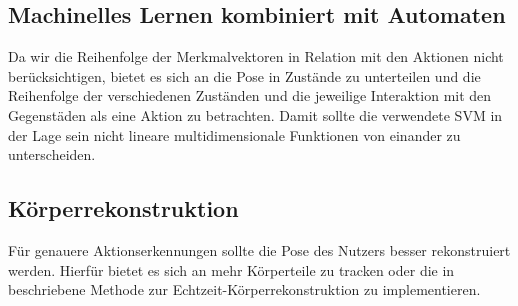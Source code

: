 \subsection{Machinelles Lernen kombiniert mit Automaten}
Da wir die Reihenfolge der Merkmalvektoren in Relation mit den Aktionen nicht berücksichtigen, bietet es sich an die Pose in Zustände zu unterteilen und die Reihenfolge der verschiedenen Zuständen und die jeweilige Interaktion mit den Gegenstäden als eine Aktion zu betrachten. Damit sollte die verwendete SVM in der Lage sein nicht lineare multidimensionale Funktionen von einander zu unterscheiden.

\subsection{Körperrekonstruktion}
Für genauere Aktionserkennungen sollte die Pose des Nutzers besser rekonstruiert werden. Hierfür bietet es sich an mehr Körperteile zu tracken oder die in \cite{body-reconstruction} beschriebene Methode zur Echtzeit-Körperrekonstruktion zu implementieren.




